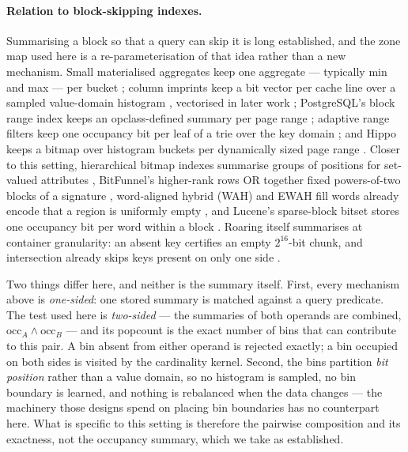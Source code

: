 \paragraph*{Relation to block-skipping indexes.} Summarising a block so that a query can skip it is
long established, and the zone map used here is a re-parameterisation of that idea rather than a new
mechanism. Small materialised aggregates keep one aggregate --- typically min and max --- per bucket
\cite{moerkotte1998sma}; column imprints keep a bit vector per cache line over a sampled
value-domain histogram \cite{sidirourgos2013imprints}, vectorised in later work
\cite{sidirourgos2017vectorimprints}; PostgreSQL's block range index keeps an opclass-defined summary
per page range \cite{postgresql-brin}; adaptive range filters keep one occupancy bit per leaf of a
trie over the key domain \cite{alexiou2013arf}; and Hippo keeps a bitmap over histogram buckets per
dynamically sized page range \cite{yu2016hippo}. Closer to this setting, hierarchical bitmap indexes
summarise groups of positions for set-valued attributes \cite{morzy2003hierarchical}, BitFunnel's
higher-rank rows OR together fixed powers-of-two blocks of a signature
\cite{goodwin2017bitfunnel}, word-aligned hybrid (WAH) and EWAH fill words already encode that a region is uniformly empty
\cite{lemire2010ewah}, and Lucene's sparse-block bitset stores one occupancy bit per word within a
block \cite{lucene-sparsefixedbitset}. Roaring itself summarises at container granularity: an absent
key certifies an empty $2^{16}$-bit chunk, and intersection already skips keys present on only one
side \cite{lemire2016roaring}.

Two things differ here, and neither is the summary itself. First, every mechanism above is
\emph{one-sided}: one stored summary is matched against a query predicate. The test used here is
\emph{two-sided} --- the summaries of both operands are combined,
$\mathrm{occ}_A \wedge \mathrm{occ}_B$ --- and its popcount is the exact number of bins that can
contribute to this pair. A bin absent from either operand is rejected exactly; a bin occupied on both
sides is visited by the cardinality kernel. Second, the bins partition \emph{bit position} rather
than a value domain, so no histogram is
sampled, no bin boundary is learned, and nothing is rebalanced when the data changes --- the
machinery those designs spend on placing bin boundaries has no counterpart here. What is specific to
this setting is therefore the pairwise composition and its exactness, not the occupancy summary,
which we take as established.

